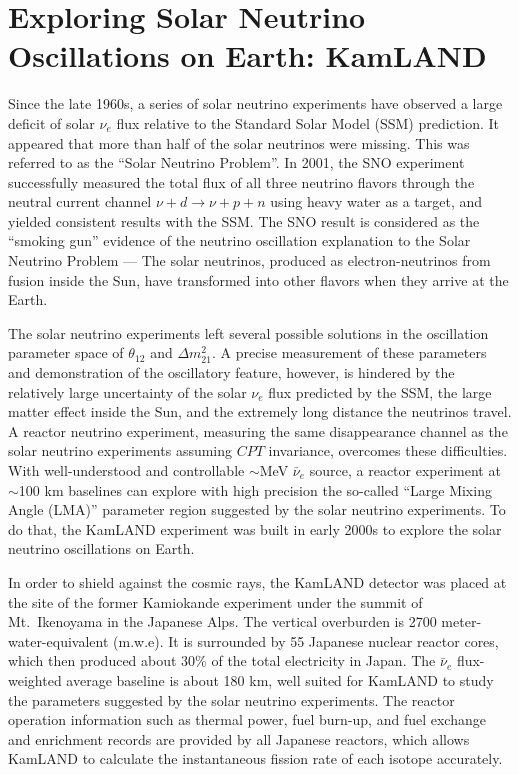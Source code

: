 \section{Exploring Solar Neutrino Oscillations on Earth: KamLAND} 
\label{sec:kamland}

Since the late 1960s, a series of solar neutrino experiments \cite{Homestake,GALLEX,SAGE,Kamiokande,Super-Kamiokande} have observed a large deficit of solar $\nu_e$ flux relative to the Standard Solar Model (SSM) \cite{Bahcall} prediction. 
It appeared that more than half of the solar neutrinos were missing. 
This was referred to as the ``Solar Neutrino Problem''. 
In 2001, the SNO experiment \cite{SNO} successfully measured the total flux of all three neutrino flavors through the neutral current channel $\nu + d \to \nu + p + n$ using heavy water as a target, and yielded consistent results with the SSM. 
The SNO result is considered as the ``smoking gun'' evidence of the neutrino oscillation explanation to the Solar Neutrino Problem --- The solar neutrinos, produced as electron-neutrinos from fusion inside the Sun, have transformed into other flavors when they arrive at the Earth.

The solar neutrino experiments left several possible solutions in the oscillation parameter space of $\theta_{12}$ and $\Delta m^2_{21}$. 
A precise measurement of these parameters and demonstration of the oscillatory feature, however, is hindered by the relatively large uncertainty of the solar $\nu_{e}$ flux predicted by the SSM, the large matter effect inside the Sun, and the extremely long distance the neutrinos travel. 
A reactor neutrino experiment, measuring the same disappearance channel as the solar neutrino experiments assuming $CPT$ invariance, overcomes these difficulties. 
With well-understood and controllable $\sim$MeV $\bar\nu_e$ source, a reactor experiment at $\sim$100 km baselines can explore with high precision the so-called ``Large Mixing Angle (LMA)'' parameter region suggested by the solar neutrino experiments. To do that, the KamLAND experiment \cite{Kamland03} was built in early 2000s to explore the solar neutrino oscillations on Earth.

In order to shield against the cosmic rays, the KamLAND detector was placed at the site of the former Kamiokande experiment \cite{Kamiokande} under the summit of Mt.~Ikenoyama in the Japanese Alps. 
The vertical overburden is 2700 meter-water-equivalent (m.w.e). 
It is surrounded by 55 Japanese nuclear reactor cores, which then produced about 30\% of the total electricity in Japan. 
The $\bar\nu_e$ flux-weighted average baseline is about 180 km, well suited for KamLAND to study the parameters suggested by the solar neutrino experiments. 
The reactor operation information such as thermal power, fuel burn-up, and fuel exchange and enrichment records are provided by all Japanese reactors, which allows KamLAND to calculate the instantaneous fission rate of each isotope accurately. 


